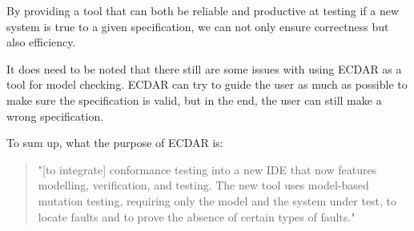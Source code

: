 By providing a tool that can both be reliable and productive at testing if a new system is true to a given specification, we can not only ensure correctness but also efficiency.

It does need to be noted that there still are some issues with using ECDAR as a tool for model checking.
ECDAR can try to guide the user as much as possible to make sure the specification is valid, but in the end, the user can still make a wrong specification.


To sum up, what the purpose of ECDAR is:
\begin{quote}
"[to integrate] conformance testing into a new IDE that now features
modelling, verification, and testing. The new tool uses model-based mutation testing, requiring only
the model and the system under test, to locate faults and to prove the absence of certain types of faults." \cite{Gundersen_2018}
\end{quote}



